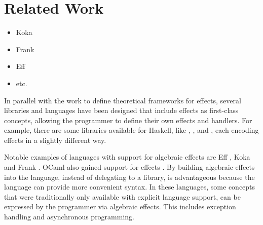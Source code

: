 \chapter{Related Work}\label{chap:related_work}

\begin{itemize}
\item Koka
\item Frank
\item Eff
\item etc.
\end{itemize}

In parallel with the work to define theoretical frameworks for effects, several libraries and languages have been designed that include effects as first-class concepts, allowing the programmer to define their own effects and handlers. For example, there are some libraries available for Haskell, like , ,  and , each encoding effects in a slightly different way.

Notable examples of languages with support for algebraic effects are Eff \autocite{bauer_programming_2015}, Koka \autocite{leijen_type_2017} and Frank \autocite{lindley_be_2017}. OCaml also gained support for effects \autocite{sivaramakrishnan_retrofitting_2021}. By building algebraic effects into the language, instead of delegating to a library, is advantageous because the language can provide more convenient syntax. In these languages, some concepts that were traditionally only available with explicit language support, can be expressed by the programmer via algebraic effects. This includes exception handling and asynchronous programming.


